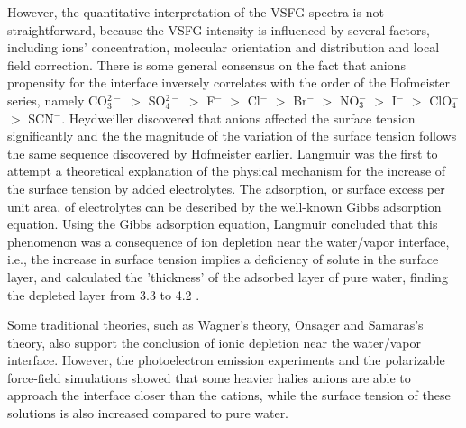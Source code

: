 However, the quantitative interpretation of the VSFG spectra is not straightforward,
because the VSFG intensity is influenced by several factors, including ions' concentration, 
molecular orientation and distribution and local field correction\cite{Morita2008}.
There is some general consensus on the fact that anions propensity for the interface inversely correlates with
the order of the Hofmeister series, namely 
CO$_3^{2-}$ $>$  SO$_4^{2-}$ $>$ F$^-$ $>$ Cl$^-$ $>$ Br$^-$ $>$ NO$_3^-$ $>$ I$^-$ $>$ ClO$_4^-$ $>$ SCN$^-$\cite{PJ06,ZYJ10,DT08,Parsons2011}. 
Heydweiller discovered that anions affected the surface tension significantly and the the magnitude of the variation of the surface tension 
follows the same sequence discovered by Hofmeister earlier\cite{dosSantos10}.
Langmuir\cite{Langmuir1917} was the first to attempt a theoretical explanation of the physical mechanism for the increase of the surface tension by added electrolytes.
The adsorption, or surface excess per unit area, of electrolytes can be described by the well-known Gibbs adsorption equation\cite{Gibbs1928, Adam1941}.
Using the Gibbs adsorption equation, Langmuir concluded that this phenomenon was a consequence of ion depletion 
near the water/vapor interface, i.e., the increase in surface tension 
implies a deficiency of solute in the surface layer\cite{Jarvis1968}, and
calculated the 'thickness' of the adsorbed layer of pure water, finding 
the depleted layer from 3.3 to 4.2 \A. 

%
Some traditional theories, such as Wagner's theory\cite{Wagner1924,dosSantos10}, 
Onsager and Samaras's theory\cite{Onsager1934}, 
also support the conclusion of ionic depletion near the water/vapor interface.
However, the photoelectron emission experiments\cite{Markovich1991,Ghosal05,Garrett04} and the polarizable 
force-field simulations\cite{Perera1991,Dang1993,Jungwirth2001,Jungwirth2002,PJ06,Horinek07,Brown08,CST11} showed that 
some heavier halies anions are able to approach the interface closer than the cations, 
while the surface tension of these solutions is also increased compared to pure water. 

